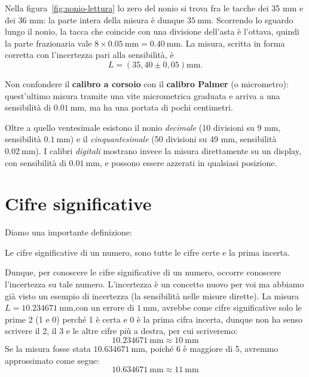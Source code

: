 \begin{testexample}
Nella figura~\ref{fig:nonio-lettura} lo zero del nonio si trova fra le tacche dei 35 mm e dei 36 mm: la parte intera della misura è dunque $\SI{35}{\milli\metre}$. Scorrendo lo sguardo lungo il nonio, la tacca che coincide con una divisione dell'asta è l'ottava, quindi la parte frazionaria vale $8\times\SI{0,05}{\milli\metre}=\SI{0,40}{\milli\metre}$. La misura, scritta in forma corretta con l'incertezza pari alla sensibilità, è
\[
    L=\left(35{,}40\pm 0{,}05\right)\si{\milli\metre}.
\]
\end{testexample}

\begin{remark}
Non confondere il \textbf{calibro a corsoio} con il \textbf{calibro Palmer} (o micrometro): quest'ultimo misura tramite una vite micrometrica graduata e arriva a una sensibilità di $\SI{0,01}{\milli\metre}$, ma ha una portata di pochi centimetri.
\end{remark}

Oltre a quello ventesimale esistono il nonio \emph{decimale} (10 divisioni su 9 mm, sensibilità $\SI{0,1}{\milli\metre}$) e il \emph{cinquantesimale} (50 divisioni su 49 mm, sensibilità $\SI{0,02}{\milli\metre}$). I calibri \emph{digitali} mostrano invece la misura direttamente su un display, con sensibilità di $\SI{0,01}{\milli\metre}$, e possono essere azzerati in qualsiasi posizione.


\section{Cifre significative}
	Diamo una importante definizione:
\begin{csf}
	Le cifre significative di un numero, sono tutte le cifre certe e la prima incerta.
\end{csf}
Dunque, per conoscere le cifre significative di un numero, occorre conoscere l'incertezza su tale numero. L'incertezza è un concetto nuovo per voi ma abbiamo già visto un esempio di incertezza (la sensibilità nelle misure dirette). La misura $L = \SI{10,234671}{\milli\meter}$,con un errore di $\SI{1}{\milli\meter}$, avrebbe come cifre significative solo le prime 2 (1 e 0) perché 1 è certa e 0 è la prima cifra incerta, dunque non ha senso scrivere il 2, il 3 e le altre cifre più a destra, per cui scriveremo:
\[
\SI{10,234671}{\milli\meter} \approx \SI{10}{\milli\meter}
\]
Se la misura fosse stata $\SI{10,634671}{\milli\meter}$, poiché 6 è maggiore di 5, avremmo approssimato come segue:
\[
\SI{10,634671}{\milli\meter} \approx \SI{11}{\milli\meter}
\]
